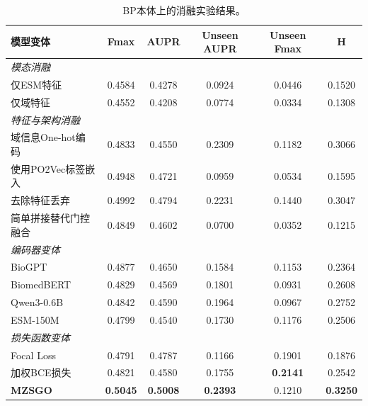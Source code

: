 \begin{table}[htbp]
    \centering
    \caption{BP本体上的消融实验结果。}
    \label{tab:mzsgo_ablation_bp}
    \small
    \begin{tabular}{lccccc}
        \toprule
        \textbf{模型变体} & \textbf{Fmax} & \textbf{AUPR} & \textbf{Unseen AUPR} & \textbf{Unseen Fmax} & \textbf{H} \\
        \midrule
        \multicolumn{6}{l}{\textit{模态消融}} \\
        仅ESM特征 & 0.4584 & 0.4278 & 0.0924 & 0.0446 & 0.1520 \\
        仅域特征 & 0.4552 & 0.4208 & 0.0774 & 0.0334 & 0.1308 \\
        \midrule
        \multicolumn{6}{l}{\textit{特征与架构消融}} \\
        域信息One-hot编码 & 0.4833 & 0.4550 & 0.2309 & 0.1182 & 0.3066 \\
        使用PO2Vec标签嵌入 & 0.4948 & 0.4721 & 0.0959 & 0.0534 & 0.1595 \\
        去除特征丢弃 & 0.4992 & 0.4794 & 0.2231 & 0.1440 & 0.3047 \\
        简单拼接替代门控融合 & 0.4849 & 0.4602 & 0.0700 & 0.0352 & 0.1215 \\
        \midrule
        \multicolumn{6}{l}{\textit{编码器变体}} \\
        BioGPT & 0.4877 & 0.4650 & 0.1584 & 0.1153 & 0.2364 \\
        BiomedBERT & 0.4829 & 0.4569 & 0.1801 & 0.0931 & 0.2608 \\
        Qwen3-0.6B & 0.4842 & 0.4590 & 0.1964 & 0.0967 & 0.2752 \\
        ESM-150M & 0.4799 & 0.4540 & 0.1730 & 0.1176 & 0.2506 \\
        \midrule
        \multicolumn{6}{l}{\textit{损失函数变体}} \\
        Focal Loss & 0.4791 & 0.4787 & 0.1166 & 0.1901 & 0.1876 \\
        加权BCE损失 & 0.4821 & 0.4580 & 0.1755 & \textbf{0.2141} & 0.2542 \\
        \midrule
        \textbf{MZSGO} & \textbf{0.5045} & \textbf{0.5008} & \textbf{0.2393} & 0.1210 & \textbf{0.3250} \\
        \bottomrule
    \end{tabular}
\end{table}

